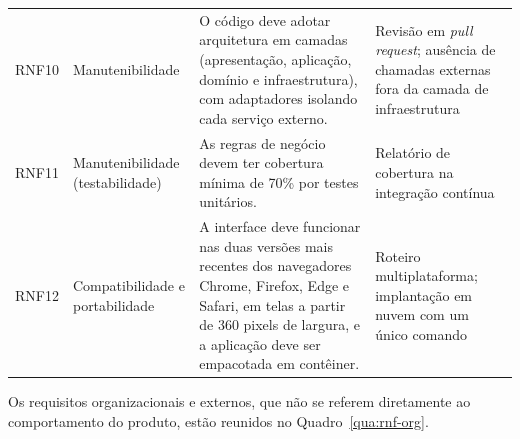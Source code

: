 \begin{longtable}{C{1.3cm}L{2.6cm}L{6.1cm}L{4.1cm}}
	RNF10       & Manutenibilidade                     & O código deve adotar arquitetura em camadas (apresentação, aplicação, domínio e infraestrutura), com adaptadores isolando cada serviço externo.                                                       & Revisão em \emph{pull request}; ausência de chamadas externas fora da camada de infraestrutura \\
	RNF11       & Manutenibilidade (testabilidade)     & As regras de negócio devem ter cobertura mínima de 70\% por testes unitários.                                                                                                                         & Relatório de cobertura na integração contínua                                                  \\
	RNF12       & Compatibilidade e portabilidade      & A interface deve funcionar nas duas versões mais recentes dos navegadores Chrome, Firefox, Edge e Safari, em telas a partir de 360 pixels de largura, e a aplicação deve ser empacotada em contêiner. & Roteiro multiplataforma; implantação em nuvem com um único comando                             \\
\end{longtable}
\vspace{-0.4cm}

Os requisitos organizacionais e externos, que não se referem diretamente ao comportamento do produto, estão reunidos no Quadro~\ref{qua:rnf-org}.

